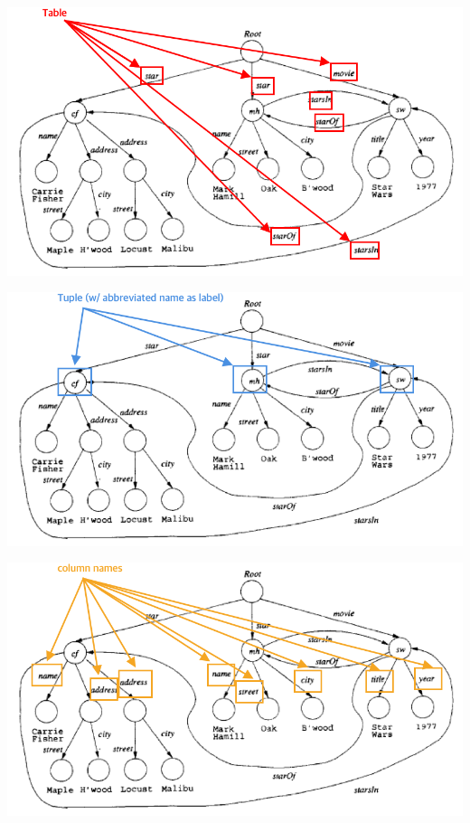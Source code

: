 \documentclass[12pt]{article}
\begin{document}
\begin{enumerate}[1.]
\begin{enumerate}[a)]
\begin{itemize}
\begin{itemize}
            \begin{center}
            \includegraphics[width=\linewidth]{images/worksheet_9_solution_1.png}
            \end{center}

            \begin{center}
            \includegraphics[width=\linewidth]{images/worksheet_9_solution_2.png}
            \end{center}

            \begin{center}
            \includegraphics[width=\linewidth]{images/worksheet_9_solution_3.png}
            \end{center}


\end{itemize}
\end{itemize}
\end{enumerate}
\end{enumerate}
\end{document}
